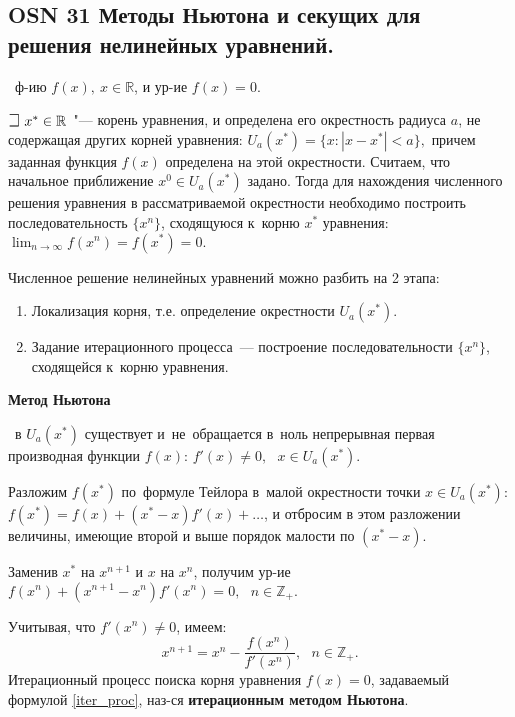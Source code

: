 \subsection{OSN 31 Методы Ньютона и секущих для решения нелинейных уравнений.}



\faEye \ ф-ию $f(x), ~x\in \mathbb{R}$, и ур-ие $f(x)=0.$

$\mathLet ~ x^* \in \mathbb{R}$~"--- корень уравнения, и определена его
окрестность радиуса $a$, не содержащая других корней уравнения: 
$U_a(x^*)=\{x:|x-x^*| < a\},$
причем заданная функция $f(x)$ определена на этой окрестности.
Считаем, что начальное приближение $x^0 \in U_a(x^*)$ задано.
Тогда для нахождения численного решения уравнения в
рассматриваемой окрестности необходимо построить последовательность
$\{x^n\}$, сходящуюся к~корню $x^*$ уравнения:
$\lim_{n\rightarrow\infty}f(x^n) = f(x^*) = 0.$
    
Численное решение нелинейных уравнений можно разбить на 2 этапа:
\begin{enumerate}
    \item Локализация корня, т.е. определение окрестности $U_a(x^*)$.
    \item Задание итерационного процесса~— построение последовательности
    $\{x^n\}$, сходящейся к~корню уравнения.
\end{enumerate}

\centerline{\textbf{Метод Ньютона}}

\mathLet \ в $U_a(x^*)$ существует и~не~обращается в~ноль непрерывная
первая производная функции $f(x)$: $f'(x) \neq 0,~~~x\in U_a(x^*).$

Разложим $f(x^*)$ по~формуле Тейлора в~малой окрестности точки $x\in U_a(x^*)$:
$f(x^*) =  f(x) + (x^* - x)f'(x) + \dots$, 
и отбросим в этом разложении величины, имеющие второй и выше порядок малости
по $(x^* - x)$.

Заменив $x^*$ на $x^{n+1}$ и $x$ на $x^n$, получим ур-ие 
$ f(x^n) + (x^{n + 1} - x^n)f'(x^n) = 0,~~~n\in \mathbb{Z}_+.$

Учитывая, что $f'(x^n) \neq 0$, имеем:
%
    \begin{equation}
        \label{iter_proc}
        x^{n + 1} = x^n - \frac{f(x^n)}{f'(x^n)},~~~n \in \mathbb{Z}_+.
    \end{equation}
%
Итерационный процесс поиска корня уравнения $f(x)=0$, задаваемый формулой \eqref{iter_proc},
наз-ся \textbf{итерационным методом Ньютона}.

